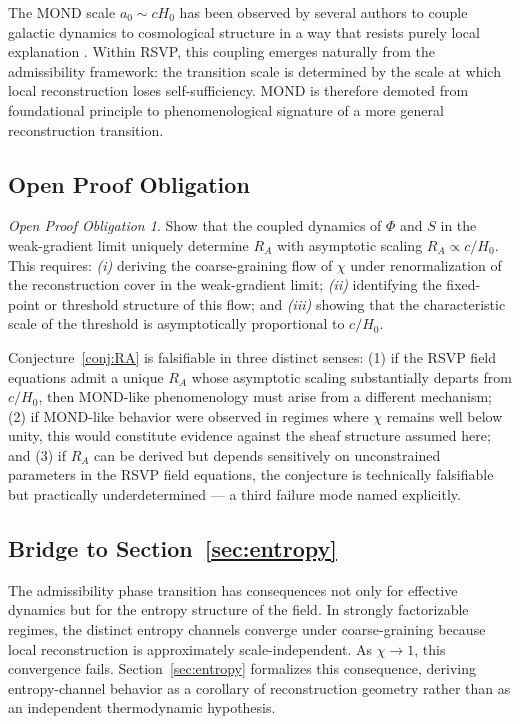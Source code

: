 \documentclass[11pt, a4paper]{article}
\theoremstyle{plain}
\theoremstyle{definition}
\theoremstyle{remark}
\newtheorem{obligation}[theorem]{Open Proof Obligation}
\newcommand{\RA}{R_{\!A}}
\begin{document}
The MOND scale $a_0 \sim cH_0$ has been observed by several authors to couple
galactic dynamics to cosmological structure in a way that resists purely local
explanation \cite{milgrom1983,famaey2012}. Within RSVP, this coupling emerges
naturally from the admissibility framework: the transition scale is determined by the
scale at which local reconstruction loses self-sufficiency. MOND is therefore demoted
from foundational principle to phenomenological signature of a more general
reconstruction transition.

\subsection{Open Proof Obligation}

\begin{obligation}
\label{obl:RA}
Show that the coupled dynamics of $\Phi$ and $S$ in the weak-gradient limit uniquely
determine $\RA$ with asymptotic scaling $\RA \propto c/H_0$. This requires:
\emph{(i)} deriving the coarse-graining flow of $\chi$ under renormalization of the
reconstruction cover in the weak-gradient limit; \emph{(ii)} identifying the
fixed-point or threshold structure of this flow; and \emph{(iii)} showing that the
characteristic scale of the threshold is asymptotically proportional to $c/H_0$.
\end{obligation}

Conjecture~\ref{conj:RA} is falsifiable in three distinct senses: (1) if the RSVP
field equations admit a unique $\RA$ whose asymptotic scaling substantially departs
from $c/H_0$, then MOND-like phenomenology must arise from a different mechanism;
(2) if MOND-like behavior were observed in regimes where $\chi$ remains well below
unity, this would constitute evidence against the sheaf structure assumed here; and
(3) if $\RA$ can be derived but depends sensitively on unconstrained parameters in
the RSVP field equations, the conjecture is technically falsifiable but practically
underdetermined --- a third failure mode named explicitly.

\subsection{Bridge to Section~\ref{sec:entropy}}

The admissibility phase transition has consequences not only for effective dynamics
but for the entropy structure of the field. In strongly factorizable regimes, the
distinct entropy channels converge under coarse-graining because local reconstruction
is approximately scale-independent. As $\chi \to 1$, this convergence fails.
Section~\ref{sec:entropy} formalizes this consequence, deriving entropy-channel
behavior as a corollary of reconstruction geometry rather than as an independent
thermodynamic hypothesis.
\end{document}
